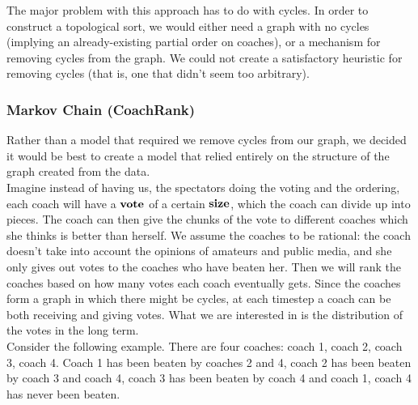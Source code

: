 \documentclass[11pt,notitlepage]{article}
\begin{document}
\noindent The major problem with this approach has to do with cycles. In order to construct a topological sort, we would either need a graph with no cycles (implying an already-existing partial order on coaches), or a mechanism for removing cycles from the graph. We could not create a satisfactory heuristic for removing cycles (that is, one that didn't seem too arbitrary).

\subsubsection{Markov Chain (CoachRank)}
Rather than a model that required we remove cycles from our graph, we decided it would be best to create a model that relied entirely on the structure of the graph created from the data.
\\

\noindent Imagine instead of having us, the spectators doing the voting and the ordering, each coach will have a $\bf{vote}$ of a certain $\bf{size}$, which the coach can divide up into pieces. The coach can then give the chunks of the vote to different coaches which she thinks is better than herself. We assume the coaches to be rational: the coach doesn't take into account the opinions of amateurs and public media, and she only gives out votes to the coaches who have beaten her. Then we will rank the coaches based on how many votes each coach eventually gets. Since the coaches form a graph in which there might be cycles, at each timestep a coach can be both receiving and giving votes. What we are interested in is the distribution of the votes in the long term.
\\

\noindent Consider the following example. There are four coaches: coach 1, coach 2, coach 3, coach 4. Coach 1 has been beaten by coaches 2 and 4, coach 2 has been beaten by coach 3 and coach 4, coach 3 has been beaten by coach 4 and coach 1, coach 4 has never been beaten.
\end{document}
